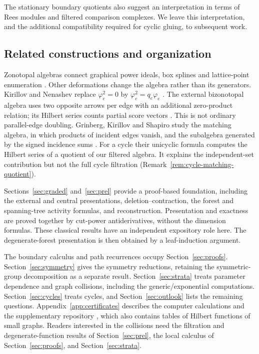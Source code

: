 \documentclass[reqno]{article}
\theoremstyle{plain} %
\theoremstyle{definition}
\theoremstyle{remark}
\numberwithin{equation}{section}
\begin{document}
The stationary boundary quotients also suggest an interpretation in
terms of Rees modules and filtered comparison complexes. We leave this
interpretation, and the additional compatibility required for cyclic
gluing, to subsequent work.

\subsection{Related constructions and organization}

Zonotopal algebras connect graphical power ideals, box splines and
lattice-point enumeration \cite{HR,AP,Lenz}. Other deformations change
the algebra rather than its generators. Kirillov and Nenashev replace
$\varphi_e^2=0$ by $\varphi_e^2=q_e\varphi_e$ \cite{KN1,KN2}.
The external bizonotopal algebra uses two opposite arrows per edge with
an additional zero-product relation; its Hilbert series counts partial
score vectors \cite{KNSV}. This is not ordinary parallel-edge doubling.
Grinberg, Kirillov and Shapiro study the matching algebra, in which
products of incident edges vanish, and the subalgebra generated by the
signed incidence sums \cite{GKS}. For a cycle their unicyclic formula computes the Hilbert series of
a quotient of our filtered algebra. It explains the
independent-set contribution but not the full cycle filtration
(Remark~\ref{rem:cycle-matching-quotient}).

Sections~\ref{sec:graded} and~\ref{sec:prel} provide a proof-based
foundation, including the external and central presentations,
deletion--contraction, the forest and spanning-tree activity formulas,
and reconstruction. Presentation and exactness are proved together by
cut-power antiderivatives, without the dimension formulas. These
classical results have an independent expository role here. The
degenerate-forest presentation is then obtained by a leaf-induction
argument.

The boundary calculus and path recurrences occupy
Section~\ref{sec:proofs}. Section~\ref{sec:symmetry} gives the symmetry
reductions, retaining the symmetric-group decomposition as a separate
result. Section~\ref{sec:strata} treats parameter dependence and graph
collisions, including the generic/exponential computations.
Section~\ref{sec:cycles} treats cycles, and Section~\ref{sec:outlook}
lists the remaining questions. Appendix~\ref{app:certificates} describes
the computer calculations and the supplementary repository \cite{Cert},
which also contains tables of Hilbert functions of small graphs. Readers
interested in the collisions need the filtration and degenerate-function
results of Section~\ref{sec:prel}, the local calculus of
Section~\ref{sec:proofs}, and Section~\ref{sec:strata}.
\end{document}
